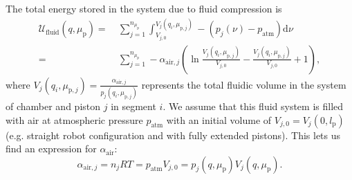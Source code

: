 The total energy stored in the system due to fluid compression is
%
\begin{equation}
\begin{split}
	\mathcal{U}_\mathrm{fluid}(q,\mu_\mathrm{p}) =& \: \sum_{j = 1}^{n_{\mu_\mathrm{p}}} \int_{V_{j,0}}^{V_j(q_i,\mu_{\mathrm{p},j})} -\left ( p_j(\nu) - p_\mathrm{atm} \right ) \mathrm{d} \nu\\
	=&\: \sum_{j=1}^{n_{\mu_\mathrm{p}}} - \alpha_{\mathrm{air},j} \left ( \ln  \frac{V_j(q_i, \mu_{\mathrm{p},j})}{V_{j,0}} - \frac{V_j(q_i, \mu_{\mathrm{p},j})}{V_{j,0}} + 1 \right ),
\end{split}
\end{equation}
%
where $V_j(q_i, \mu_{\mathrm{p},j}) = \frac{\alpha_{\mathrm{air},j}}{p_j(q_i, \mu_{\mathrm{p},j})}$ represents the total fluidic volume in the system of chamber and piston $j$ in segment $i$. We assume that this fluid system is filled with air at atmospheric pressure $p_\mathrm{atm}$ with an initial volume of $V_{j,0} = V_j(0, l_\mathrm{p})$ (e.g. straight robot configuration and with fully extended pistons). 
This lets us find an expression for $\alpha_{\mathrm{air}}$:
\begin{equation}
    \alpha_{\mathrm{air},j} = n_j R T = p_\mathrm{atm} V_{j,0} = p_{j}(q,\mu_\mathrm{p}) V_{j}(q,\mu_\mathrm{p}).
\end{equation}
%


